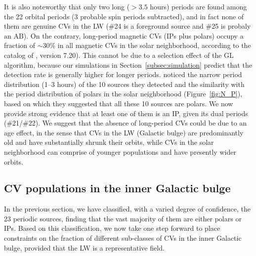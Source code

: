 \documentclass[fleqn,usenatbib]{mnras}
\begin{document}
It is also noteworthy that only two long ($>3.5$ hours) periods are found among the 22 orbital periods (3 probable spin periods subtracted), and in fact none of them are genuine CVs in the LW (\#24 is a foreground source and \#25 is probaly an AB).
On the contrary, long-period magnetic CVs (IPs plus polars) occupy a fraction of $\sim$30\% in all magnetic CVs in the solar neighborhood, according to the catalog of \citealp{2003A&A...404..301R}, version 7.20). 
This cannot be due to a selection effect of the GL algorithm, because our simulations in Section~\ref{subsec:simulation} predict that the detection rate is generally higher for longer periods.
\cite{2012ApJ...746..165H} noticed the narrow period distribution (1--3 hours) of the 10 sources they detected and the similarity with the period distribution of polars in the solar neighborhood (Figure~\ref{fig:N_P}), based on which they suggested that all these 10 sources are polars. 
We now provide strong evidence that at least one of them is an IP, given its dual periods (\#21/\#22).
We suggest that the absence of long-period CVs could be due to an age effect, in the sense that CVs in the LW (Galactic bulge) are predominantly old and have substantially shrunk their orbits, while CVs in the solar neighborhood can comprise of younger populations and have presently wider orbits.  

\subsection{CV populations in the inner Galactic bulge}\label{subsec:population}
In the previous section, we have classified, with a varied degree of confidence, the 23 periodic sources, finding that the vast majority of them are either polars or IPs. Based on this classification, we now take one step forward to place constraints on the fraction of different sub-classes of CVs in the inner Galactic bulge, provided that the LW is a representative field. 
\end{document}
